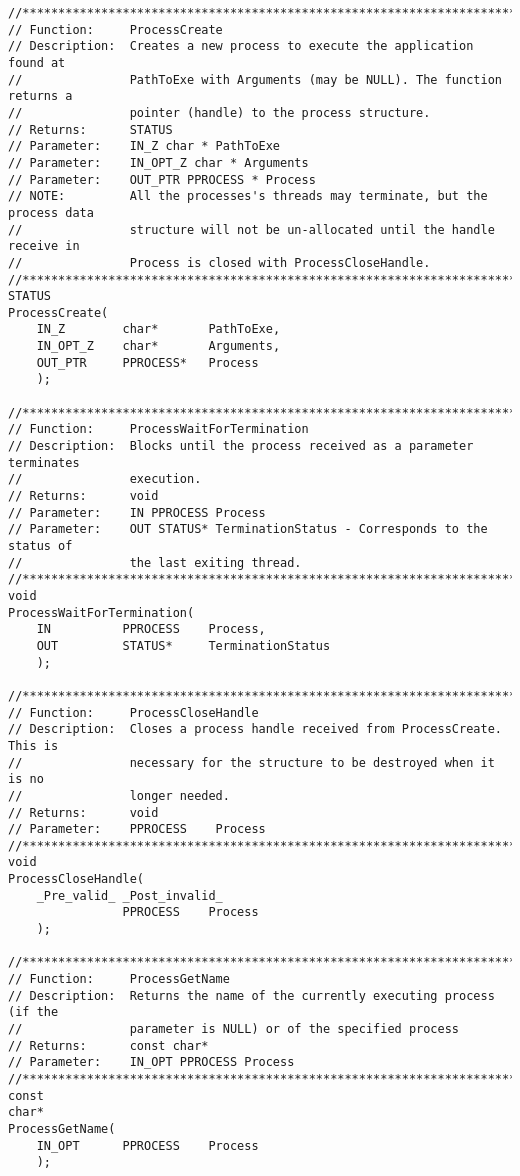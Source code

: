\begin{appendices}
\begin{lstlisting}[caption={Process Public Interface},label={lst:ProcPublic}]
//******************************************************************************
// Function:     ProcessCreate
// Description:  Creates a new process to execute the application found at
//               PathToExe with Arguments (may be NULL). The function returns a
//               pointer (handle) to the process structure.
// Returns:      STATUS
// Parameter:    IN_Z char * PathToExe
// Parameter:    IN_OPT_Z char * Arguments
// Parameter:    OUT_PTR PPROCESS * Process
// NOTE:         All the processes's threads may terminate, but the process data
//               structure will not be un-allocated until the handle receive in
//               Process is closed with ProcessCloseHandle.
//******************************************************************************
STATUS
ProcessCreate(
    IN_Z        char*       PathToExe,
    IN_OPT_Z    char*       Arguments,
    OUT_PTR     PPROCESS*   Process
    );

//******************************************************************************
// Function:     ProcessWaitForTermination
// Description:  Blocks until the process received as a parameter terminates
//               execution.
// Returns:      void
// Parameter:    IN PPROCESS Process
// Parameter:    OUT STATUS* TerminationStatus - Corresponds to the status of
//               the last exiting thread.
//******************************************************************************
void
ProcessWaitForTermination(
    IN          PPROCESS    Process,
    OUT         STATUS*     TerminationStatus
    );

//******************************************************************************
// Function:     ProcessCloseHandle
// Description:  Closes a process handle received from ProcessCreate. This is
//               necessary for the structure to be destroyed when it is no
//               longer needed.
// Returns:      void
// Parameter:    PPROCESS    Process
//******************************************************************************
void
ProcessCloseHandle(
    _Pre_valid_ _Post_invalid_
                PPROCESS    Process
    );

//******************************************************************************
// Function:     ProcessGetName
// Description:  Returns the name of the currently executing process (if the
//               parameter is NULL) or of the specified process
// Returns:      const char*
// Parameter:    IN_OPT PPROCESS Process
//******************************************************************************
const
char*
ProcessGetName(
    IN_OPT      PPROCESS    Process
    );


\end{lstlisting}
\end{appendices}
